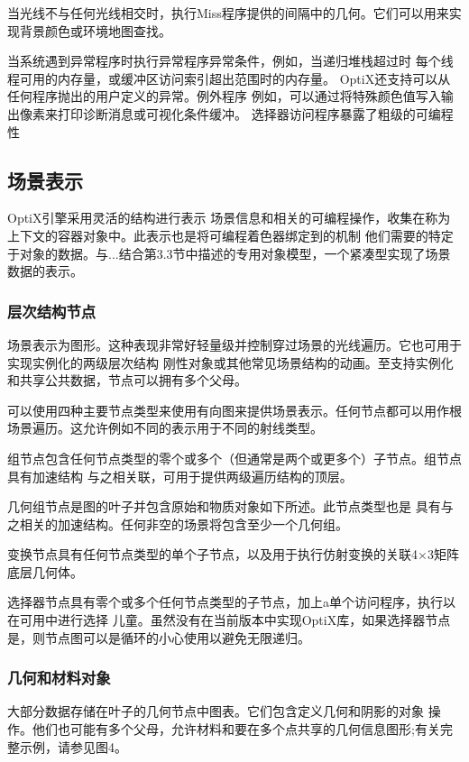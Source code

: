 当光线不与任何光线相交时，执行Miss程序提供的间隔中的几何。它们可以用来实现背景颜色或环境地图查找。

当系统遇到异常程序时执行异常程序异常条件，例如，当递归堆栈超过时
每个线程可用的内存量，或缓冲区访问索引超出范围时的内存量。 OptiX还支持可以从任何程序抛出的用户定义的异常。例外程序
例如，可以通过将特殊颜色值写入输出像素来打印诊断消息或可视化条件缓冲。
选择器访问程序暴露了粗级的可编程性

\subsection{场景表示}

OptiX引擎采用灵活的结构进行表示
场景信息和相关的可编程操作，收集在称为上下文的容器对象中。此表示也是将可编程着色器绑定到的机制
他们需要的特定于对象的数据。与...结合第3.3节中描述的专用对象模型，一个紧凑型实现了场景数据的表示。

\subsubsection{层次结构节点}

场景表示为图形。这种表现非常好轻量级并控制穿过场景的光线遍历。它也可用于实现实例化的两级层次结构
刚性对象或其他常见场景结构的动画。至支持实例化和共享公共数据，节点可以拥有多个父母。

可以使用四种主要节点类型来使用有向图来提供场景表示。任何节点都可以用作根场景遍历。这允许例如不同的表示用于不同的射线类型。

组节点包含任何节点类型的零个或多个（但通常是两个或更多个）子节点。组节点具有加速结构
与之相关联，可用于提供两级遍历结构的顶层。

几何组节点是图的叶子并包含原始和物质对象如下所述。此节点类型也是
具有与之相关的加速结构。任何非空的场景将包含至少一个几何组。

变换节点具有任何节点类型的单个子节点，以及用于执行仿射变换的关联4×3矩阵
底层几何体。

选择器节点具有零个或多个任何节点类型的子节点，加上a单个访问程序，执行以在可用中进行选择
儿童。虽然没有在当前版本中实现OptiX库，如果选择器节点是，则节点图可以是循环的小心使用以避免无限递归。

\subsubsection{几何和材料对象}

大部分数据存储在叶子的几何节点中图表。它们包含定义几何和阴影的对象
操作。他们也可能有多个父母，允许材料和要在多个点共享的几何信息图形;有关完整示例，请参见图4。

